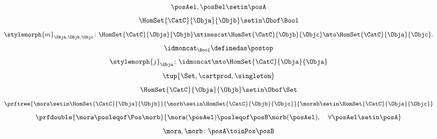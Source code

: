 {\begin{forslides}
\begin{equation}
        \label{eq:poset_bool_f}
        \posAel,\posBel \setin \posA
    \end{equation}
    \begin{equation}
        \label{eq:poset_bool_g}
        \HomSet{\CatC}{\Obja}{\Objb}\setin \Obof\Bool
    \end{equation}
    \begin{equation}
        \label{eq:poset_bool_h}
        \stylemorph{m}_{\Obja,\Objb,\Objc}\colon \HomSet{\CatC}{\Obja}{\Objb}\mtimescat \HomSet{\CatC}{\Objb}{\Objc}\mto \HomSet{\CatC}{\Obja}{\Objc}.
    \end{equation}
    \begin{equation}
        \label{eq:poset_bool_i}
        \idmoncat_{\Bool} \definedas \postop
    \end{equation}
    \begin{equation}
        \label{eq:poset_bool_k}
        \stylemorph{j}_\Obja\colon \idmoncat \mto \HomSet{\CatC}{\Obja}{\Obja}
    \end{equation}
    \begin{equation}
        \label{eq:poset_bool_j}
        \tup{\Set, \cartprod, \singleton}
    \end{equation}
    \begin{equation}
        \label{eq:poset_bool_l}
        \HomSet{\CatC}{\Obja}{\Objb}\setin \Obof\Set
    \end{equation}
    \begin{equation}
        \label{eq:poset_bool_m}
        \prftree{\mora \setin \HomSet{\CatC}{\Obja}{\Objb}}{\morb \setin \HomSet{\CatC}{\Objb}{\Objc}}{{\morab \setin \HomSet{\CatC}{\Obja}{\Objc}}}
    \end{equation}
    \begin{equation}
        \label{eq:poset_pos_a}
        \prfdouble{
            \mora \posleqof\Pos \morb}{\mora(\posAel)\posleqof\posB \morb(\posAel), \quad \forall \posAel \setin \posA}
    \end{equation}
    \begin{equation}
        \label{eq:poset_pos_b}
        \mora,\morb\colon \posA\toinPos \posB
    \end{equation}


\end{forslides}}
